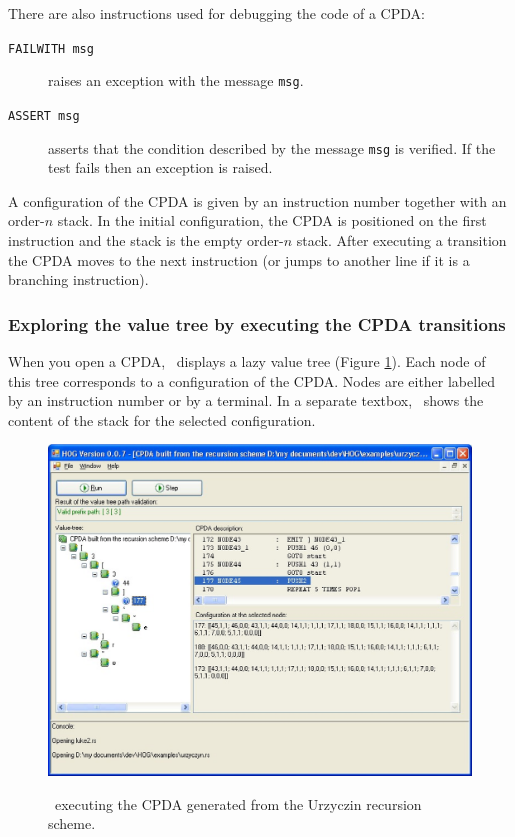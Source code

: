 There are also instructions used for debugging the code of a CPDA:
\begin{description}
  \item[{\tt FAILWITH msg}] raises an exception with the message {\tt msg}.
  \item[{\tt ASSERT msg}] asserts that the condition described by the message {\tt msg} is verified. If the test fails then an exception is raised.
\end{description}



A configuration of the CPDA is given by an instruction number together with an order-$n$ stack. In the initial configuration, the CPDA is positioned on the first instruction and the stack is the empty order-$n$ stack. After executing a transition the CPDA moves to the next instruction (or jumps to another line if it is a branching instruction).




\subsubsection{Exploring the value tree by executing the CPDA transitions }

When you open a CPDA, \toolname\ displays a lazy value tree (Figure \ref{fig:sshot_cpda}). Each node of this tree corresponds to a configuration of the CPDA. Nodes are either labelled by an instruction number or by a terminal. In a separate textbox, \toolname\ shows the content of the stack for the selected configuration.

\begin{figure}
\begin{bigcenter}
  \includegraphics[width=14cm]{sshot_cpda}\\
\end{bigcenter}
  \caption{\toolname\ executing the CPDA generated from the Urzyczin recursion scheme.}
  \label{fig:sshot_cpda}
\end{figure}

